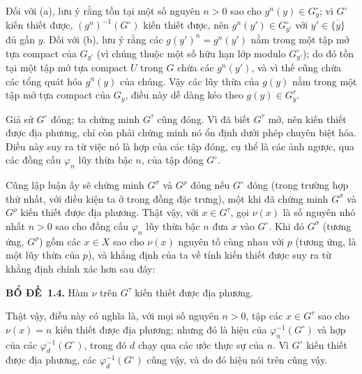 \documentclass[11pt,twoside,openany]{book}
\numberwithin{equation}{section}
\newcommand{\src}[1]{%
  \phantomsection\hypertarget{src:\fgasourceid:#1}{}%
  \marginpar{\raggedleft\footnotesize\sffamily #1}%
}
\newcommand{\fgasourceid}{unset}
\newcommand{\result}[2]{\par\medskip\noindent\textbf{#1\if\relax\detokenize{#2}\relax\else\ #2\fi.}\quad}
\begin{document}
Đối với (a), lưu ý rằng tồn tại một số nguyên $n>0$ sao cho
$g^n(y)\in G_y^\circ$; vì $G^\circ$ kiến thiết được,
$(g^n)^{-1}(G^\circ)$ kiến thiết được, nên
$g^n(y')\in G_{y'}^\circ$ với $y'\in\overline{\{y\}}$ đủ gần $y$. Đối với
(b), lưu ý rằng các $g(y')^n=g^n(y')$ nằm trong một tập mở tựa compact của
$G_{y'}$ (vì chúng thuộc một số hữu hạn lớp modulo $G_{y'}^\circ$); do đó tồn
tại một tập mở tựa compact $U$ trong $G$ chứa các $g^n(y')$, và vì thế cũng
chứa các tổng quát hóa $g^n(y)$ của chúng. Vậy các lũy thừa của $g(y)$ nằm
trong một tập mở tựa compact của $G_y$, điều này dễ dàng kéo theo
$g(y)\in G_y^\tau$.
\src{226}
Giả sử $G^\circ$ đóng; ta chứng minh $G^\tau$ cũng đóng. Vì đã biết
$G^\tau$ mở, nên kiến thiết được địa phương, chỉ còn phải chứng minh nó ổn
định dưới phép chuyên biệt hóa. Điều này suy ra từ việc nó là hợp của các tập
đóng, cụ thể là các ảnh ngược, qua các đồng cấu $\varphi_n$ lũy thừa bậc
$n$, của tập đóng $G^\circ$.

Cũng lập luận ấy sẽ chứng minh $G^\sigma$ và $G^\rho$ đóng nếu $G^\circ$
đóng (trong trường hợp thứ nhất, với điều kiện ta ở trong đồng đặc trưng), một
khi đã chứng minh $G^\sigma$ và $G^\rho$ kiến thiết được địa phương. Thật vậy,
với $x\in G^\tau$, gọi $\nu(x)$ là số nguyên nhỏ nhất $n>0$ sao cho đồng cấu
$\varphi_n$ lũy thừa bậc $n$ đưa $x$ vào $G^\circ$. Khi đó $G^\sigma$
(tương ứng, $G^\rho$) gồm các $x\in X$ sao cho $\nu(x)$ nguyên tố cùng nhau với $p$ (tương ứng,
là một lũy thừa của $p$), và khẳng định của ta về tính kiến thiết được suy ra
từ khẳng định chính xác hơn sau đây:

\result{BỔ ĐỀ}{1.4} Hàm $\nu$ trên $G^\tau$ kiến thiết được địa phương.

Thật vậy, điều này có nghĩa là, với mọi số nguyên $n>0$, tập các
$x\in G^\tau$ sao cho $\nu(x)=n$ kiến thiết được địa phương; nhưng đó là hiệu
của $\varphi_n^{-1}(G^\circ)$ và hợp của các
$\varphi_d^{-1}(G^\circ)$, trong đó $d$ chạy qua các ước thực sự của $n$. Vì
$G^\circ$ kiến thiết được địa phương, các $\varphi_d^{-1}(G^\circ)$ cũng vậy,
và do đó hiệu nói trên cũng vậy.
\end{document}

